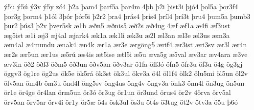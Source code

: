 {^^fd5u
^^fd5^^fa
^^fd3v
^^fd5y
z^^f34
^^fe2a
^^feam4
^^fearf5a
^^fear4m
4^^feb
^^fe2i
^^feist3i
^^fej^^f34
^^feol5a
^^feor3f4
^^feor3g
^^feorm4
^^fe1^^f3l
3^^fe^^f3r
^^fe^^f3r5i
^^fe2r2
^^fera4
^^fer^^e1s4
^^feris4
^^fer^^edl4
^^fer^^ed3t
^^feru4
^^feum5a
^^feumb3
^^feur2
^^fe^^fas3
^^fe2v
^^fever5sk
^^e61b
^^e6^^f0n5
^^e6^^f0nis5
^^e6^^f02s
^^e6^^f04ug
4^^e6f
^^e6f1a
^^e64fi
^^e6f3ust
^^e6g5ist
^^e61i
^^e6j3
^^e6j4al
^^e6jark4
^^e6k1a
^^e6k1li
^^e6k3u
^^e62l
^^e6l3an
^^e6l3e
^^e6l3us
^^e6m3a
^^e6m4al
^^e64mundu
^^e6nak4
^^e6n4k
^^e6r1a
^^e6r3e
^^e6rg^^f6ng5
^^e6rif4
^^e6r3ist
^^e6ri3sv
^^e6r3l
^^e6r4n
^^e6r2s
^^e6r5un
^^e6r1us
^^e65r^^fa
^^e6s4is
^^e6t5ise
^^e6tl5i
^^e65u
^^e6va5g
^^e65val
^^e6v3ar
^^e6v4ara
^^e63ve
^^e6v3in
^^f6^^f02
^^f6^^f0l3
^^f6^^f0m5
^^f6^^f03un
^^f6^^f0v5an
^^f6^^f0v3ar
^^f61fa
^^f6fl3^^f3
^^f6fn5
^^f6fr3u
^^f6f3u
^^f64g
^^f6g3gj
^^f6ggv3
^^f6g1re
^^f6g2us
^^f6k5e
^^f6k5r^^e1
^^f6k3st
^^f6k3ul
^^f6kv3a
^^f64l
^^f6l1f4
^^f6lk2
^^f6lu5mi
^^f6l5un
^^f6l2v
^^f6lv5an
^^f6m4b
^^f6m3u
^^f6nd4l
^^f6ng5sv
^^f6ng4us
^^f6ng4v
^^f6ngv3a
^^f6nk3
^^f6nn4l
^^f6n3ug
^^f6n5un
^^f6r1e
^^f6r4ge
^^f6r4lan
^^f6rm5un
^^f6r3^^f3
^^f6r3ug
^^f6r1un
^^f6r3und
^^f6rus4
^^f6r2v
4^^f6rva
^^f6rv5al
^^f6rv5an
^^f6rv5ar
^^f6rv4i
^^f6r1y
^^f6r5^^e6
^^f64s
^^f6sk3ul
^^f6s3u
^^f6t4s
^^f63tug
^^f6t2v
^^f6tv3a
^^f65u
^^fe6^^f3
}


